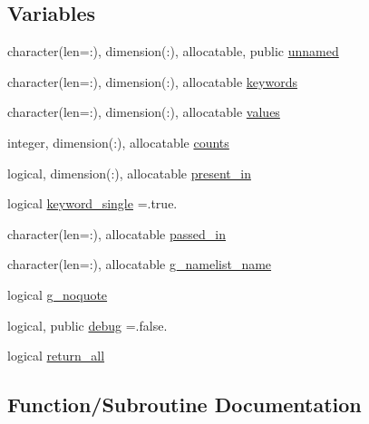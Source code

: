 \subsection*{Variables}
\begin{DoxyCompactItemize}
\item 
character(len=\+:), dimension(\+:), allocatable, public \mbox{\hyperlink{namespacem__cli_a7fd43837c254f34109d9f523c66c873a}{unnamed}}
\item 
character(len=\+:), dimension(\+:), allocatable \mbox{\hyperlink{namespacem__cli_a1eb7801692b3d6e25f16885fdf027f42}{keywords}}
\item 
character(len=\+:), dimension(\+:), allocatable \mbox{\hyperlink{namespacem__cli_aaec25aa63c2964c1125b9f14f27bf44a}{values}}
\item 
integer, dimension(\+:), allocatable \mbox{\hyperlink{namespacem__cli_ac6af3775222feedc5aff5874ce63897a}{counts}}
\item 
logical, dimension(\+:), allocatable \mbox{\hyperlink{namespacem__cli_ad08e57d14b3543d476d00e6bfda58fa5}{present\+\_\+in}}
\item 
logical \mbox{\hyperlink{namespacem__cli_a179ac9786afe3fe8474d97ac1a4f1d4c}{keyword\+\_\+single}} =.true.
\item 
character(len=\+:), allocatable \mbox{\hyperlink{namespacem__cli_aedc9f3e906ef523605292fd8cf8b00c0}{passed\+\_\+in}}
\item 
character(len=\+:), allocatable \mbox{\hyperlink{namespacem__cli_acd2598fd229b4b584315292251217c31}{g\+\_\+namelist\+\_\+name}}
\item 
logical \mbox{\hyperlink{namespacem__cli_a456bb87244997f19111533666a96b9eb}{g\+\_\+noquote}}
\item 
logical, public \mbox{\hyperlink{namespacem__cli_a83b45c240c1c7309a38c358ebcde28ec}{debug}} =.false.
\item 
logical \mbox{\hyperlink{namespacem__cli_a0320cf9d95b01ffbbd8f5a2e0d01ff26}{return\+\_\+all}}
\end{DoxyCompactItemize}


\subsection{Function/\+Subroutine Documentation}
\mbox{\label{namespacem__cli_a62056f0c153eb63cb0b11a21edb028cd}} 

